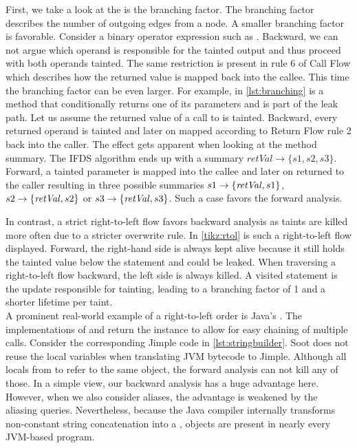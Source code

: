 \documentclass[../draft.tex]{subfiles}
\begin{document}
    First, we take a look at the is the branching factor. 
    The branching factor describes the number of outgoing edges from a node. 
    A smaller branching factor is favorable.   
    Consider a binary operator expression such as .
    Backward, we can not argue which operand is responsible for the tainted output and thus proceed with both operands tainted.
    The same restriction is present in rule 6 of Call Flow which describes how the returned value is mapped back into the callee.
    This time the branching factor can be even larger.
    For example, in \autoref{lst:branching} is a method that conditionally returns one of its parameters and is part of the leak path.
    Let us assume the returned value of a call to  is tainted. Backward, every returned operand is tainted and later on mapped according to Return Flow rule 2 back into the caller.
    The effect gets apparent when looking at the method summary.
    The IFDS algorithm ends up with a summary $\mathit{retVal} \rightarrow \{s1, s2, s3\}$. 
    Forward, a tainted parameter is mapped into the callee and later on returned to the caller resulting in three possible summaries  $s1 \rightarrow \mathit\{\mathit{retVal}, s1\}$, $s2 \rightarrow \mathit\{\mathit{retVal}, s2\}$ or $s3 \rightarrow \mathit\{\mathit{retVal}, s3\}$.
    Such a case favors the forward analysis.

    In contrast, a strict right-to-left flow favors backward analysis as taints are killed more often due to a stricter overwrite rule. 
    In \autoref{tikz:rtol} is such a right-to-left flow displayed. 
    Forward, the right-hand side is always kept alive because it still holds the tainted value below the statement and could be leaked. 
    When traversing a right-to-left flow backward, the left side is always killed. 
    A visited statement is the update responsible for tainting, leading to a branching factor of 1 and a shorter lifetime per taint.\\
    A prominent real-world example of a right-to-left order is Java's . 
    The implementations of  and  return the  instance to allow for easy chaining of multiple calls.
    Consider the corresponding Jimple code in \autoref{lst:stringbuilder}.
    Soot does not reuse the local variables when translating JVM bytecode to Jimple\footnotemark{}.
    Although all locals from  to  refer to the same object, the forward analysis can not kill any of those.
    In a simple view, our backward analysis has a huge advantage here.
    However, when we also consider aliases, the advantage is weakened by the aliasing queries.
    Nevertheless, because the Java compiler internally transforms non-constant string concatenation into a ,  objects are present in nearly every JVM-based program.
\end{document}
